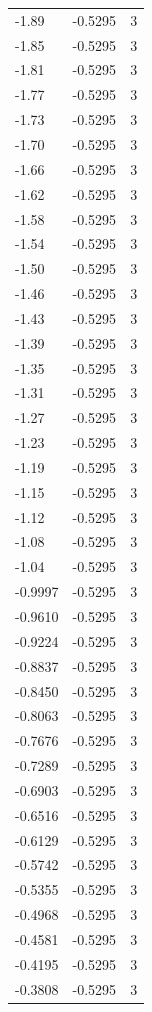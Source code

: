 \begin{longtable}{lrr}
  -1.89 & -0.5295 & 3 \\
  -1.85 & -0.5295 & 3 \\
  -1.81 & -0.5295 & 3 \\
  -1.77 & -0.5295 & 3 \\
  -1.73 & -0.5295 & 3 \\
  -1.70 & -0.5295 & 3 \\
  -1.66 & -0.5295 & 3 \\
  -1.62 & -0.5295 & 3 \\
  -1.58 & -0.5295 & 3 \\
  -1.54 & -0.5295 & 3 \\
  -1.50 & -0.5295 & 3 \\
  -1.46 & -0.5295 & 3 \\
  -1.43 & -0.5295 & 3 \\
  -1.39 & -0.5295 & 3 \\
  -1.35 & -0.5295 & 3 \\
  -1.31 & -0.5295 & 3 \\
  -1.27 & -0.5295 & 3 \\
  -1.23 & -0.5295 & 3 \\
  -1.19 & -0.5295 & 3 \\
  -1.15 & -0.5295 & 3 \\
  -1.12 & -0.5295 & 3 \\
  -1.08 & -0.5295 & 3 \\
  -1.04 & -0.5295 & 3 \\
  -0.9997 & -0.5295 & 3 \\
  -0.9610 & -0.5295 & 3 \\
  -0.9224 & -0.5295 & 3 \\
  -0.8837 & -0.5295 & 3 \\
  -0.8450 & -0.5295 & 3 \\
  -0.8063 & -0.5295 & 3 \\
  -0.7676 & -0.5295 & 3 \\
  -0.7289 & -0.5295 & 3 \\
  -0.6903 & -0.5295 & 3 \\
  -0.6516 & -0.5295 & 3 \\
  -0.6129 & -0.5295 & 3 \\
  -0.5742 & -0.5295 & 3 \\
  -0.5355 & -0.5295 & 3 \\
  -0.4968 & -0.5295 & 3 \\
  -0.4581 & -0.5295 & 3 \\
  -0.4195 & -0.5295 & 3 \\
  -0.3808 & -0.5295 & 3 \\

\end{longtable}
